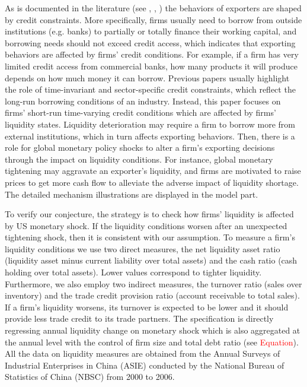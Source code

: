 As is documented in the literature (see \cite{manova2012export}, \cite{manova2013credit}, \cite{manova2015firm}) the behaviors of exporters are shaped by credit constraints. More specifically, firms usually need to borrow from outside institutions (e.g. banks) to partially or totally finance their working capital, and borrowing needs should not exceed credit access, which indicates that exporting behaviors are affected by firms' credit conditions. For example, if a firm has very limited credit access from commercial banks, how many products it will produce depends on how much money it can borrow. Previous papers usually highlight the role of time-invariant and sector-specific credit constraints, which reflect the long-run borrowing conditions of an industry. Instead, this paper focuses on firms' short-run time-varying credit conditions which are affected by firms' liquidity states. Liquidity deterioration may require a firm to borrow more from external institutions, which in turn affects exporting behaviors. Then, there is a role for global monetary policy shocks to alter a firm's exporting decisions through the impact on liquidity conditions. For instance, global monetary tightening may aggravate an exporter's liquidity, and firms are motivated to raise prices to get more cash flow to alleviate the adverse impact of liquidity shortage. The detailed mechanism illustrations are displayed in the model part.

To verify our conjecture, the strategy is to check how firms' liquidity is affected by US monetary shock. If the liquidity conditions worsen after an unexpected tightening shock, then it is consistent with our assumption. To measure a firm's liquidity conditions we use two direct measures, the net liquidity asset ratio (liquidity asset minus current liability over total assets) and the cash ratio (cash holding over total assets). Lower values correspond to tighter liquidity. Furthermore, we also employ two indirect measures, the turnover ratio (sales over inventory) and the trade credit provision ratio (account receivable to total sales). If a firm's liquidity worsens, its turnover is expected to be lower and it should provide less trade credit to its trade partners. The specification is directly regressing annual liquidity change on monetary shock which is also aggregated at the annual level with the control of firm size and total debt ratio (see \textcolor{red}{Equation}). All the data on liquidity measures are obtained from the Annual Surveys of Industrial Enterprises in China (ASIE) conducted by the National Bureau of Statistics of China (NBSC) from 2000 to 2006. 


